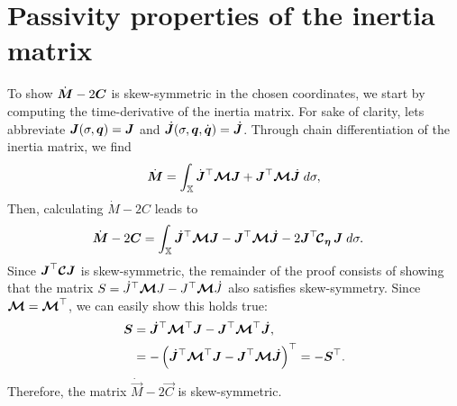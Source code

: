 \section{Passivity properties of the inertia matrix}
\noindent To show $\dot{\boldsymbol{M}} - 2\boldsymbol{C}$ is skew-symmetric in the chosen coordinates, we start by computing the time-derivative of the inertia matrix. For sake of clarity, lets abbreviate ${\boldsymbol{J}}(\sigma,{\boldsymbol{q}}) = {\boldsymbol{J}}$ and $\,\,\dot{\!\!\boldsymbol{J}}(\sigma,{\boldsymbol{q}},{\dot{\boldsymbol{q}}}) = \,\,\dot{\!\!\boldsymbol{J}}$. Through chain differentiation of the inertia matrix, we find
%
\begin{equation}
\dot{\boldsymbol{M}} = \int_{\mathbb{X}} \dot{{\boldsymbol{J}}}^\top \boldsymbol{\mathcal{M}} {\boldsymbol{J}} + {\boldsymbol{J}}^\top \boldsymbol{\mathcal{M}} \,\,\dot{\!\!\boldsymbol{J}} \; d \sigma,
\end{equation}
%
Then, calculating $\dot{M} - 2C$ leads to
%
\begin{align}
\dot{\boldsymbol{M}} - 2\boldsymbol{C} & = \int_{\mathbb{X}} \,\,\dot{\!\!\boldsymbol{J}}^\top \boldsymbol{\mathcal{M}} {\boldsymbol{J}} - {\boldsymbol{J}}^\top \boldsymbol{\mathcal{M}}\,\,\dot{\!\!\boldsymbol{J}} - 2{\boldsymbol{J}}^\top \!\boldsymbol{\mathcal{C}}_{{\boldsymbol{\eta}}} \, {\boldsymbol{J}} \; d\sigma.
\end{align}
%
Since ${\boldsymbol{J}}^\top \boldsymbol{\mathcal{C}} {\boldsymbol{J}}$ is skew-symmetric, the remainder of the proof consists of showing that the matrix $S = \dot{J}^\top \boldsymbol{\mathcal{M}} J - J^\top \boldsymbol{\mathcal{M}} \dot{J}$ also satisfies skew-symmetry. Since $\boldsymbol{\mathcal{M}} = \boldsymbol{\mathcal{M}}^\top$, we can easily show this holds true:
%
\begin{align}
\SB & = \dJB^\top \ten{M}^\top \JB - \JB^\top \ten{M}^\top \dJB, \notag \\
 & = -\left(\dJB^\top \ten{M}^\top \JB - \JB^\top \ten{M} \dJB \right)^\top = -\SB^\top.
\end{align}
%
Therefore, the matrix $\dot{\vec{M}} - 2\vec{C}$ is skew-symmetric.

